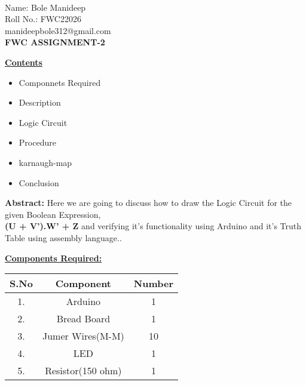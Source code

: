 \documentclass[10pt,a4paper]{report}
\begin{document}
 \vspace{3mm}\\ \raggedleft Name: Bole Manideep\vspace{2mm}\\ \raggedleft Roll No.: FWC22026\vspace{2mm}\\ \raggedleft manideepbole312@gmail.com \vspace{10mm}
\\ \centering \Large \textbf{FWC ASSIGNMENT-2} \normalsize \vspace{15mm}
\begin{multicols}{2} \raggedright \large \textbf{\underline{Contents}} \normalsize \vspace{5mm}
\begin{itemize}
\raggedright  \item Componnets Required \item Description \item Logic Circuit \item Procedure \item karnaugh-map \item Conclusion
\end{itemize} \vspace{5mm}
\raggedright \hspace{10mm} \textbf{Abstract:}  Here we are going to discuss how to draw the Logic Circuit for the given Boolean Expression,\\  \textbf{(U + V').W' + Z} and verifying it's functionality using Arduino and it's Truth Table using assembly language..\vspace{5mm} 
\\ \raggedright \large \textbf{\underline{Components Required:}} \normalsize \vspace{3mm}

\begin{center}
    \setlength{\arrayrulewidth}{0.1mm}
\setlength{\tabcolsep}{12pt}
\renewcommand{\arraystretch}{1.5}
    \begin{tabular}{|c|c|c|}
    \hline %
      \textbf{S.No} & \textbf{Component} & \textbf{Number}\\
      \hline
	1. & Arduino & 1 \\
	2. & Bread Board & 1 \\
	3. & Jumer Wires(M-M) & 10 \\
	4. & LED & 1 \\
	5. & Resistor(150 ohm) & 1 \\ 
      \hline
      

\end{tabular}
\end{center}
\end{multicols}
\end{document}
